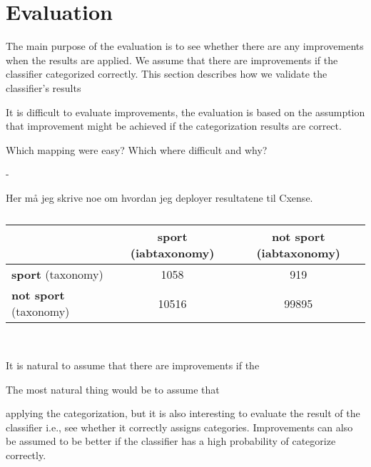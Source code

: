\section{Evaluation}
The main purpose of the evaluation is to see whether there are any improvements when the results are applied. We assume that there are improvements if the classifier categorized correctly. This section describes how we validate the classifier's results 


It is difficult to evaluate improvements, the evaluation is based on the assumption that improvement might be achieved if the categorization results are correct. 



Which mapping were easy? Which where difficult and why?

- 

\begin{code}

Her må jeg skrive noe om hvordan jeg deployer resultatene til Cxense. 

\end{code}

\begin{table}[ht]
\centering
\renewcommand{\arraystretch}{1.25}
\begin{tabularx}{\textwidth}{l |c|c}
 & \textbf{sport} (iabtaxonomy) & \textbf{not sport} (iabtaxonomy)\\ \hline
 \textbf{sport} (taxonomy) & 1058 & 919 \\ \hline
 \textbf{not sport} (taxonomy) & 10516 & 99895
\end{tabularx}
\\[10pt]
\caption{}
\label{tab:}
\end{table}


\begin{comment}
Date: 15/04/15

\end{comment}




It is natural to assume that there are improvements if the 

The most natural thing would be to assume that 


applying the categorization, but it is also interesting to evaluate the result of the classifier i.e., see whether it correctly assigns categories. Improvements can also be assumed to be better if the classifier has a high probability of categorize correctly.

